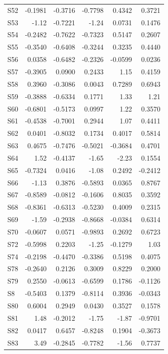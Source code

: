 \begin{longtable}{lrrrrr}
  S52 & -0.1981 & -0.3716 & -0.7798 & 0.4342 & 0.3721 \\
  S53 & -1.12 & -0.7221 & -1.24 & 0.0731 & 0.1476 \\
  S54 & -0.2482 & -0.7622 & -0.7323 & 0.5147 & 0.2607 \\
  S55 & -0.3540 & -0.6408 & -0.3244 & 0.3235 & 0.4440 \\
  S56 & 0.0358 & -0.6482 & -0.2326 & -0.0599 & 0.0236 \\
  S57 & -0.3905 & 0.0900 & 0.2433 & 1.15 & 0.4159 \\
  S58 & 0.3960 & -0.3086 & 0.0043 & 0.7289 & 0.6943 \\
  S59 & -0.3888 & -0.6334 & 0.1771 & 1.33 & 1.21 \\
  S60 & -0.6801 & -0.5173 & 0.0997 & 1.22 & 0.3570 \\
  S61 & -0.4538 & -0.7001 & 0.2944 & 1.07 & 0.4411 \\
  S62 & 0.0401 & -0.8032 & 0.1734 & 0.4017 & 0.5814 \\
  S63 & 0.4675 & -0.7476 & -0.5021 & -0.3684 & 0.4701 \\
  S64 & 1.52 & -0.4137 & -1.65 & -2.23 & 0.1554 \\
  S65 & -0.7324 & 0.0416 & -1.08 & 0.2492 & -0.2412 \\
  S66 & -1.13 & 0.3876 & -0.5893 & 0.0365 & 0.8767 \\
  S67 & -0.8589 & -0.0812 & -0.1606 & 0.8035 & 0.3592 \\
  S68 & -0.8361 & -0.6313 & -0.5230 & 0.4009 & 0.2315 \\
  S69 & -1.59 & -0.2938 & -0.8668 & -0.0384 & 0.6314 \\
  S70 & -0.0607 & 0.0571 & -0.9893 & 0.2692 & 0.6723 \\
  S72 & -0.5998 & 0.2203 & -1.25 & -0.1279 & 1.03 \\
  S74 & -0.2198 & -0.4470 & -0.3386 & 0.5198 & 0.4075 \\
  S78 & -0.2640 & 0.2126 & 0.3009 & 0.8229 & 0.2000 \\
  S79 & 0.2550 & -0.0613 & -0.6599 & 0.1786 & -0.1126 \\
  S8 & -0.5403 & 0.1379 & -0.8114 & 0.3936 & -0.0343 \\
  S80 & 0.6004 & 0.2949 & 0.0430 & 0.3527 & 0.1578 \\
  S81 & 1.48 & -0.2012 & -1.75 & -1.87 & -0.9701 \\
  S82 & 0.0417 & 0.6457 & -0.8248 & 0.1904 & -0.3673 \\
  S83 & 3.49 & -0.2845 & -0.7782 & -1.56 & 0.7737 \\

\end{longtable}
